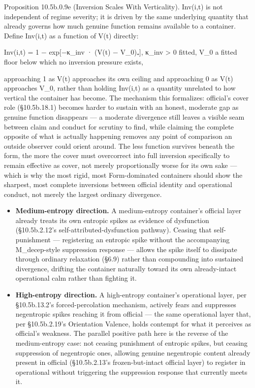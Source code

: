 \documentclass[
]{article}
\begin{document}
Proposition 10.5b.0.9e (Inversion Scales With Verticality). Inv(i,t) is
not independent of regime severity; it is driven by the same underlying
quantity that already governs how much genuine function remains
available to a container. Define Inv(i,t) as a function of V(t)
directly:

Inv(i,t) = 1 − exp{[}−κ\_inv · (V(t) − V\_0)₊{]}, κ\_inv \textgreater{}
0 fitted, V\_0 a fitted floor below which no inversion pressure exists,

approaching 1 as V(t) approaches its own ceiling and approaching 0 as
V(t) approaches V\_0, rather than holding Inv(i,t) as a quantity
unrelated to how vertical the container has become. The mechanism this
formalizes: official's cover role (§10.5b.18.1) becomes harder to sustain
with an honest, moderate gap as genuine function disappears --- a
moderate divergence still leaves a visible seam between claim and
conduct for scrutiny to find, while claiming the complete opposite of
what is actually happening removes any point of comparison an outside
observer could orient around. The less function survives beneath the
form, the more the cover must overcorrect into full inversion
specifically to remain effective as cover, not merely proportionally
worse for its own sake --- which is why the most rigid, most
Form-dominated containers should show the sharpest, most complete
inversions between official identity and operational conduct, not merely
the largest ordinary divergence.

\begin{itemize}
\item
  \textbf{Medium-entropy direction.} A medium-entropy container's
  official layer already treats its own entropic spikes as evidence of
  dysfunction (§10.5b.2.12's self-attributed-dysfunction pathway).
  Ceasing that self-punishment --- registering an entropic spike without
  the accompanying M\_decep-style suppression response --- allows the
  spike itself to dissipate through ordinary relaxation (§6.9) rather
  than compounding into sustained divergence, drifting the container
  naturally toward its own already-intact operational calm rather than
  fighting it.
\item
  \textbf{High-entropy direction.} A high-entropy container's
  operational layer, per §10.5b.13.2's forced-percolation mechanism,
  actively fears and suppresses negentropic spikes reaching it from
  official --- the same operational layer that, per §10.5b.2.19's
  Orientation Valence, holds contempt for what it perceives as
  official's weakness. The parallel positive path here is the reverse of
  the medium-entropy case: not ceasing punishment of entropic spikes,
  but ceasing suppression of negentropic ones, allowing genuine
  negentropic content already present in official (§10.5b.2.13's
  frozen-but-intact official layer) to register in operational without
  triggering the suppression response that currently meets it.
\end{itemize}
\end{document}
